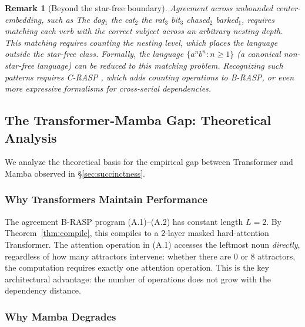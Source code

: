 \documentclass[11pt]{article}
\newtheorem*{remark}{Remark}
\begin{document}
\begin{remark}[Beyond the star-free boundary]
Agreement across unbounded center-embedding, such as \textit{The dog$_1$ the cat$_2$ the rat$_3$ bit$_3$ chased$_2$ barked$_1$}, requires matching each verb with the correct subject across an arbitrary nesting depth.
This matching requires counting the nesting level, which places the language outside the star-free class.
Formally, the language $\{a^n b^n : n \geq 1\}$ (a canonical non-star-free language) can be reduced to this matching problem.
Recognizing such patterns requires C-RASP \citep{DBLP:conf/nips/YangCCN25}, which adds counting operations to B-RASP, or even more expressive formalisms for cross-serial dependencies.
\end{remark}

\subsection{The Transformer-Mamba Gap: Theoretical Analysis}
\label{app:succinctness-proof}

We analyze the theoretical basis for the empirical gap between Transformer and Mamba observed in \S\ref{sec:succinctness}.

\subsubsection{Why Transformers Maintain Performance}

The agreement B-RASP program (A.1)--(A.2) has constant length $L = 2$.
By Theorem~\ref{thm:compile}, this compiles to a 2-layer masked hard-attention Transformer.
The attention operation in (A.1) accesses the leftmost noun \emph{directly}, regardless of how many attractors intervene: whether there are 0 or 8 attractors, the computation requires exactly one attention operation.
This is the key architectural advantage: the number of operations does not grow with the dependency distance.

\subsubsection{Why Mamba Degrades}
\end{document}

